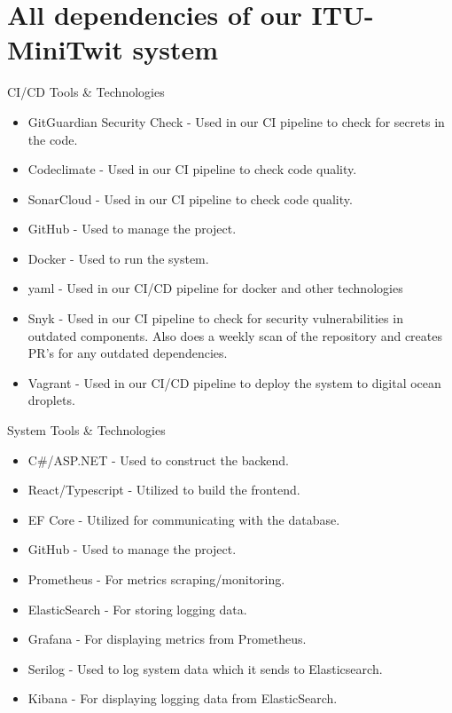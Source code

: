 \section{All dependencies of our ITU-MiniTwit system}

\gls{CI}/\gls{CD} Tools \& Technologies
\begin{itemize}
    \item GitGuardian Security Check - Used in our \gls{CI} pipeline to check for secrets in the code.
    \item Codeclimate - Used in our \gls{CI} pipeline to check code quality.
    \item SonarCloud - Used in our \gls{CI} pipeline to check code quality.
    \item GitHub - Used to manage the project.
    \item Docker - Used to run the system.
    \item yaml - Used in our \gls{CI}/\gls{CD} pipeline for docker and other technologies
    \item Snyk - Used in our \gls{CI} pipeline to check for security vulnerabilities in outdated components. Also does a weekly scan of the repository and creates \gls{PR}'s for any outdated dependencies.
    \item Vagrant - Used in our \gls{CI}/\gls{CD} pipeline to deploy the system to digital ocean droplets.
\end{itemize}

System Tools \& Technologies
\begin{itemize}
    \item C\#/ASP.NET - Used to construct the backend.
    \item React/Typescript - Utilized to build the frontend.
    \item \gls{EF} Core - Utilized for communicating with the database.
    \item GitHub - Used to manage the project.
    \item Prometheus - For metrics scraping/monitoring.
    \item ElasticSearch - For storing logging data.
    \item Grafana - For displaying metrics from Prometheus.
    \item Serilog - Used to log system data which it sends to Elasticsearch.
    \item Kibana - For displaying logging data from ElasticSearch.
\end{itemize}




